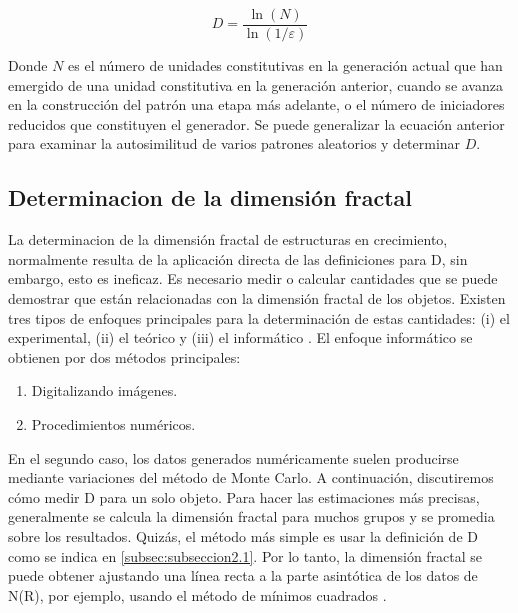 \documentclass[11pt]{article}
\begin{document}
\begin{equation}
 D = \frac{\ln(N)}{\ln(1/\varepsilon)}
\end{equation}

Donde \(N\) es el n\'{u}mero de unidades constitutivas en la generaci\'{o}n actual que han emergido de una unidad constitutiva en la generaci\'{o}n anterior, cuando se avanza en la construcci\'{o}n del patr\'{o}n una etapa m\'{a}s adelante, o el n\'{u}mero de iniciadores reducidos que constituyen el generador. Se puede generalizar la ecuaci\'{o}n anterior para examinar la autosimilitud de varios patrones aleatorios y determinar \(D\).
 
\subsection{Determinacion de la dimensi\'{o}n fractal}
\label{subsec:subseccion2.2}


La determinacion de la dimensi\'{o}n fractal de estructuras en crecimiento, normalmente resulta de la aplicaci\'{o}n directa de las definiciones para D, sin embargo, esto es ineficaz. Es necesario medir o calcular cantidades que se puede demostrar que est\'{a}n relacionadas con la dimensi\'{o}n fractal de los objetos. Existen  tres tipos de enfoques principales para la determinaci\'{o}n de estas cantidades: (i) el experimental, (ii) el te\'{o}rico y (iii) el inform\'{a}tico \cite{Vicsek1992}. El enfoque inform\'{a}tico se obtienen por dos m\'{e}todos principales: 


\begin{enumerate}
\item Digitalizando im\'{a}genes.
\item Procedimientos num\'{e}ricos.
\end{enumerate}
 
  En el segundo caso, los datos generados num\'{e}ricamente suelen producirse mediante variaciones del m\'{e}todo de Monte Carlo. A continuaci\'{o}n, discutiremos c\'{o}mo medir D para un solo objeto. Para hacer las estimaciones m\'{a}s precisas, generalmente se calcula la dimensi\'{o}n fractal para muchos grupos y se promedia sobre los resultados. Quiz\'{a}s, el m\'{e}todo m\'{a}s simple es usar la definici\'{o}n de  D como se indica en \ref{subsec:subseccion2.1}. Por lo tanto, la dimensi\'{o}n fractal se puede obtener ajustando una l\'{i}nea recta a la parte asint\'{o}tica de los datos de  N(R), por ejemplo, usando el m\'{e}todo de m\'{i}nimos cuadrados \cite{Vicsek1992}.
  
\end{document}
